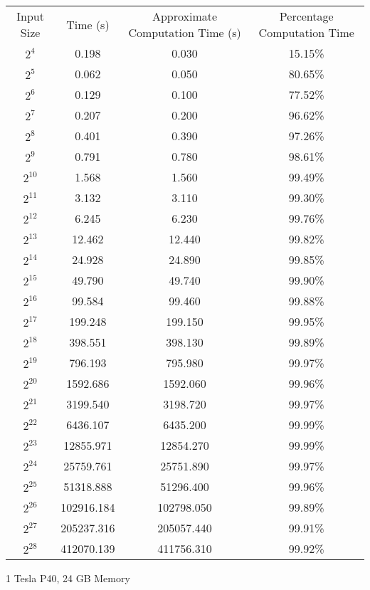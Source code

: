 \begin{center}
    \begin{tabular}{c | c | c | c}
         Input Size & Time (s) &  Approximate Computation Time (s) & Percentage Computation Time \\
        $2^4$ & 0.198 & 0.030 & 15.15\% \\
        $2^5$ & 0.062 & 0.050 & 80.65\% \\
        $2^6$ & 0.129 & 0.100 & 77.52\% \\
        $2^7$ & 0.207 & 0.200 & 96.62\% \\
        $2^8$ & 0.401 & 0.390 & 97.26\% \\
        $2^9$ & 0.791 & 0.780 & 98.61\% \\
        $2^{10}$ & 1.568 & 1.560 & 99.49\% \\
        $2^{11}$ & 3.132 & 3.110 & 99.30\% \\
        $2^{12}$ & 6.245 & 6.230 & 99.76\% \\
        $2^{13}$ & 12.462 & 12.440 & 99.82\% \\
        $2^{14}$ & 24.928 & 24.890 & 99.85\% \\
        $2^{15}$ & 49.790 & 49.740 & 99.90\% \\
        $2^{16}$ & 99.584 & 99.460 & 99.88\% \\
        $2^{17}$ & 199.248 & 199.150 & 99.95\% \\
        $2^{18}$ & 398.551 & 398.130 & 99.89\% \\
        $2^{19}$ & 796.193 & 795.980 & 99.97\% \\
        $2^{20}$ & 1592.686 & 1592.060 & 99.96\% \\
        $2^{21}$ & 3199.540 & 3198.720 & 99.97\% \\
        $2^{22}$ & 6436.107 & 6435.200 & 99.99\% \\
        $2^{23}$ & 12855.971 & 12854.270 & 99.99\% \\
        $2^{24}$ & 25759.761 & 25751.890 & 99.97\% \\
        $2^{25}$ & 51318.888 & 51296.400 & 99.96\% \\
        $2^{26}$ & 102916.184 & 102798.050 & 99.89\% \\
        $2^{27}$ & 205237.316 & 205057.440 & 99.91\% \\
        $2^{28}$ & 412070.139 & 411756.310 & 99.92\% \\
    \end{tabular} 
    \newpage
    
    1 Tesla P40, 24 GB Memory
    

\end{center}
